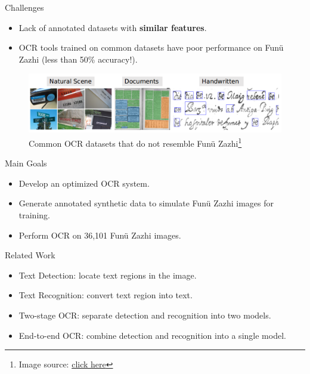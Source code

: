 \documentclass{beamer}
\begin{document}
\begin{frame}
    \begin{center}
        \Large{Challenges}
    \end{center}
    \begin{itemize}
        \item Lack of annotated datasets with \textbf{similar features}.
        \item OCR tools trained on common datasets have poor performance on Funü Zazhi (less than 50\% accuracy!).
    \end{itemize}
    \begin{figure}
        \centering
        \includegraphics[width=\textwidth]{figures/datasets.png}
        \caption{Common OCR datasets that do not resemble Funü Zazhi\footnote{Image source: \href{https://github.com/xinke-wang/OCRDatasets?tab=readme-ov-file}{click here}}}
    \end{figure}
\end{frame}

\begin{frame}
    \begin{center}
        \Large{Main Goals}
    \end{center}
    \begin{itemize}
        \item Develop an optimized OCR system.
        \item Generate annotated synthetic data to simulate Funü Zazhi images for training.
        \item Perform OCR on 36,101 Funü Zazhi images.
    \end{itemize}
\end{frame}

\begin{frame}
    \begin{center}
        \Large{Related Work}
    \end{center}
    \begin{itemize}
        \item Text Detection: locate text regions in the image.
        \item Text Recognition: convert text region into text.
        \item Two-stage OCR: separate detection and recognition into two models.
        \item End-to-end OCR: combine detection and recognition into a single model.
    \end{itemize}
\end{frame}
\end{document}
